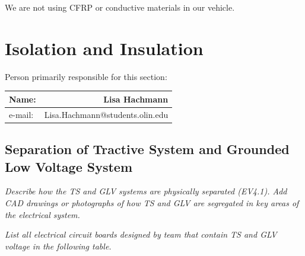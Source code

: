 \documentclass{article}
\begin{document}
We are not using CFRP or conductive materials in our vehicle.

\section{Isolation and Insulation}
Person primarily responsible for this section:
    \begin{table}[H]
        \centering
        \label{responsible3}
        \begin{tabular}{lr}
        Name: & Lisa Hachmann \\ \hline
        e-mail: & Lisa.Hachmann@students.olin.edu \\ \hline
        \end{tabular}
    \end{table}

    \subsection{Separation of Tractive System and Grounded Low Voltage System}

\textit{Describe how the TS and GLV systems are physically separated (EV4.1). Add CAD drawings or photographs of how TS and GLV are segregated in key areas of the electrical system.}


\textit{List all electrical circuit boards designed by team that contain TS and GLV voltage in the following table.}


\end{document}
